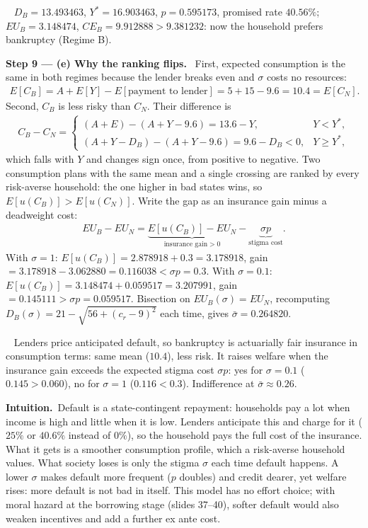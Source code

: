 \documentclass[11pt,a4paper]{article}
\newcommand{\step}[2]{\par\medskip\noindent\textbf{Step #1 --- #2.}~}
\newcommand{\intuition}{\par\medskip\noindent\textbf{Intuition.}~}
\newcommand{\answer}[1]{\par\smallskip\noindent\fbox{\textbf{Answer #1.}}~}
\begin{document}
\answer{(d)} $D_B=13.493463$, $Y^*=16.903463$, $p=0.595173$, promised rate $40.56\%$; $EU_B=3.148474$,
$CE_B=9.912888>9.381232$: now the household prefers bankruptcy (Regime B).

\step{9}{(e) Why the ranking flips} First, expected consumption is the same in both regimes because the lender
breaks even and $\sigma$ costs no resources:
\begin{align}
  E[C_B] = A+E[Y]-E[\text{payment to lender}] = 5+15-9.6 = 10.4 = E[C_N]. \nonumber
\end{align}
Second, $C_B$ is less risky than $C_N$. Their difference is
\begin{align}
  C_B-C_N = \begin{cases} (A+E)-(A+Y-9.6) = 13.6-Y, & Y<Y^*,\\ (A+Y-D_B)-(A+Y-9.6) = 9.6-D_B<0, & Y\ge Y^*,\end{cases} \nonumber
\end{align}
which falls with $Y$ and changes sign once, from positive to negative. Two consumption plans with the same mean
and a single crossing are ranked by every risk-averse household: the one higher in bad states wins, so
$E[u(C_B)]>E[u(C_N)]$. Write the gap as an insurance gain minus a deadweight cost:
\begin{align}
  EU_B-EU_N = \underbrace{E[u(C_B)]-EU_N}_{\text{insurance gain}>0} - \underbrace{\sigma p}_{\text{stigma cost}}. \label{t4e17-decomp}
\end{align}
With $\sigma=1$: $E[u(C_B)]=2.878918+0.3=3.178918$, gain $=3.178918-3.062880=0.116038<\sigma p=0.3$.
With $\sigma=0.1$: $E[u(C_B)]=3.148474+0.059517=3.207991$, gain $=0.145111>\sigma p=0.059517$.
Bisection on $EU_B(\sigma)=EU_N$, recomputing $D_B(\sigma)=21-\sqrt{56+(c_r-9)^2}$ each time, gives
$\bar\sigma=0.264820$.

\answer{(e)} Lenders price anticipated default, so bankruptcy is actuarially fair insurance in consumption terms:
same mean ($10.4$), less risk. It raises welfare when the insurance gain exceeds the expected stigma cost
$\sigma p$: yes for $\sigma=0.1$ ($0.145>0.060$), no for $\sigma=1$ ($0.116<0.3$). Indifference at
$\bar\sigma\approx0.26$.

\intuition Default is a state-contingent repayment: households pay a lot when income is high and little when it is
low. Lenders anticipate this and charge for it ($25\%$ or $40.6\%$ instead of $0\%$), so the household pays the full
cost of the insurance. What it gets is a smoother consumption profile, which a risk-averse household values. What
society loses is only the stigma $\sigma$ each time default happens. A lower $\sigma$ makes default more frequent
($p$ doubles) and credit dearer, yet welfare rises: more default is not bad in itself. This model has no effort
choice; with moral hazard at the borrowing stage (slides 37--40), softer default would also weaken incentives
and add a further ex ante cost.
\end{document}
